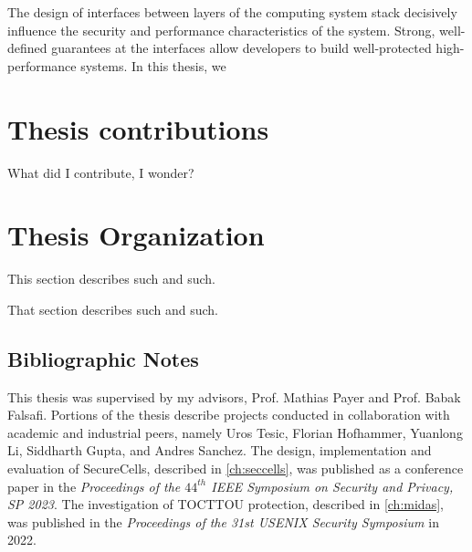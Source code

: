 The design of interfaces between layers of the computing system stack decisively influence the 
security and performance characteristics of the system. 
Strong, well-defined guarantees at the interfaces allow developers to build well-protected high-performance systems.
In this thesis, we 

\section{Thesis contributions}

What did I contribute, I wonder?

\section{Thesis Organization}

This section describes such and such.

That section describes such and such.

\subsection{Bibliographic Notes}
This thesis was supervised by my advisors, Prof. Mathias Payer and Prof. Babak Falsafi.
Portions of the thesis describe projects conducted in collaboration with academic and
industrial peers, namely Uros Tesic, Florian Hofhammer, Yuanlong Li, Siddharth Gupta, 
and Andres Sanchez.
The design, implementation and evaluation of SecureCells, described in 
\autoref{ch:seccells}, was published as a conference paper in the 
\emph{Proceedings of the $44^{th}$ IEEE Symposium on Security and Privacy, SP 2023}.
The investigation of TOCTTOU protection, described in \autoref{ch:midas},
was published in the
\emph{Proceedings of the 31st USENIX Security Symposium} in 2022.

